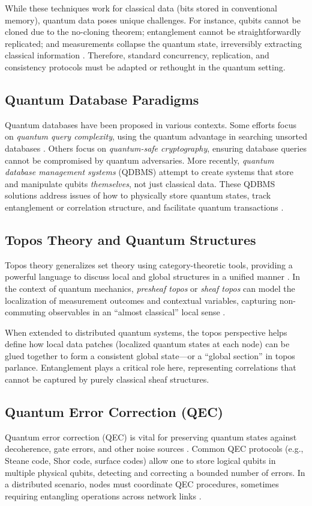 \documentclass[11pt]{article}
\begin{document}
While these techniques work for classical data (bits stored in conventional memory), quantum data poses unique challenges. For instance, qubits cannot be cloned due to the no-cloning theorem; entanglement cannot be straightforwardly replicated; and measurements collapse the quantum state, irreversibly extracting classical information \cite{preskill}. Therefore, standard concurrency, replication, and consistency protocols must be adapted or rethought in the quantum setting.

\subsection{Quantum Database Paradigms}
Quantum databases have been proposed in various contexts. Some efforts focus on \emph{quantum query complexity}, using the quantum advantage in searching unsorted databases \cite{grover}. Others focus on \emph{quantum-safe cryptography}, ensuring database queries cannot be compromised by quantum adversaries. More recently, \emph{quantum database management systems} (QDBMS) attempt to create systems that store and manipulate qubits \textit{themselves}, not just classical data. These QDBMS solutions address issues of how to physically store quantum states, track entanglement or correlation structure, and facilitate quantum transactions \cite{lloyd, giovannetti}.

\subsection{Topos Theory and Quantum Structures}
\label{sec:topos_background}
Topos theory generalizes set theory using category-theoretic tools, providing a powerful language to discuss local and global structures in a unified manner \cite{maclane, johnstone, bell}. In the context of quantum mechanics, \emph{presheaf topos} or \emph{sheaf topos} can model the localization of measurement outcomes and contextual variables, capturing non-commuting observables in an “almost classical” local sense \cite{isham_topos, doering_isham}.

When extended to distributed quantum systems, the topos perspective helps define how local data patches (localized quantum states at each node) can be glued together to form a consistent global state---or a “global section” in topos parlance. Entanglement plays a critical role here, representing correlations that cannot be captured by purely classical sheaf structures.

\subsection{Quantum Error Correction (QEC)}
Quantum error correction (QEC) is vital for preserving quantum states against decoherence, gate errors, and other noise sources \cite{shor, steane, nielsen_chuang}. Common QEC protocols (e.g., Steane code, Shor code, surface codes) allow one to store logical qubits in multiple physical qubits, detecting and correcting a bounded number of errors. In a distributed scenario, nodes must coordinate QEC procedures, sometimes requiring entangling operations across network links \cite{jiang, wallraff_review}.
\end{document}
